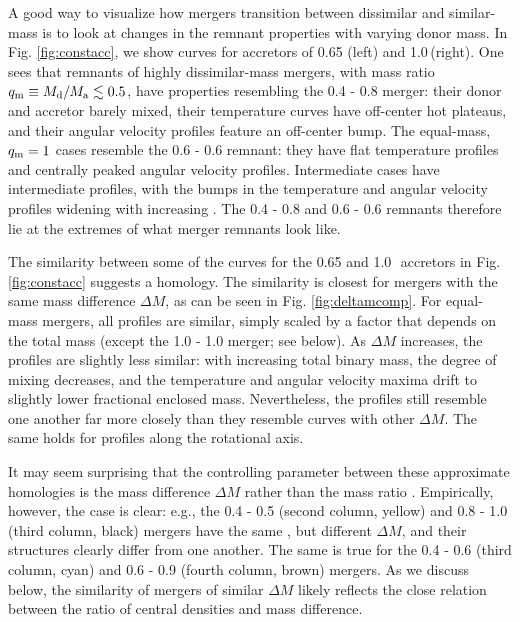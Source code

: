 A good way to visualize how mergers transition between dissimilar and similar-mass is to look at changes in the remnant properties with varying donor mass.  In Fig. \ref{fig:constacc}, we show curves for accretors of 0.65 (left) and 1.0\,\Msun (right).  One sees that remnants of highly dissimilar-mass mergers, with mass ratio $\qm\equiv M_\mrm{d}/M_\mrm{a} \lesssim0.5$, have properties resembling the 0.4 - 0.8 {\Msun} merger: their donor and accretor barely mixed, their temperature curves have off-center hot plateaus, and their angular velocity profiles feature an off-center bump.  The equal-mass, $\qm=1$ cases resemble the 0.6 - 0.6 {\Msun} remnant: they have flat temperature profiles and centrally peaked angular velocity profiles.  Intermediate cases have intermediate profiles, with the bumps in the temperature and angular velocity profiles widening with increasing {\qm}.  The 0.4 - 0.8 {\Msun} and 0.6 - 0.6 {\Msun} remnants therefore lie at the extremes of what merger remnants look like.


The similarity between some of the curves for the 0.65 and 1.0\,\Msun\ accretors in Fig. \ref{fig:constacc} suggests a homology.  The similarity is closest for mergers with the same mass difference $\Delta M$, as can be seen in Fig. \ref{fig:deltamcomp}.
For equal-mass mergers, all profiles are similar, simply scaled by a factor that depends on the total mass (except the 1.0 - 1.0 {\Msun} merger; see below).  As $\Delta M$ increases, the profiles are slightly less similar: with increasing total binary mass, the degree of mixing decreases, and the temperature and angular velocity maxima drift to slightly lower fractional enclosed mass.  Nevertheless, the profiles still resemble one another far more closely than they resemble curves with other $\Delta M$.  The same holds for profiles along the rotational axis.

It may seem surprising that the controlling parameter between these approximate homologies is the mass difference $\Delta M$ rather than the mass ratio {\qm}.  Empirically, however, the case is clear: e.g., the 0.4 - 0.5 (second column, yellow) and 0.8 - 1.0 {\Msun} (third column, black) mergers have the same {\qm}, but different $\Delta M$, and their structures clearly differ from one another.  The same is true for the 0.4 - 0.6 (third column, cyan) and 0.6 - 0.9 (fourth column, brown) {\Msun} mergers.  As we discuss below, the similarity of mergers of similar $\Delta M$ likely reflects the close relation between the ratio of central densities and mass difference.  

